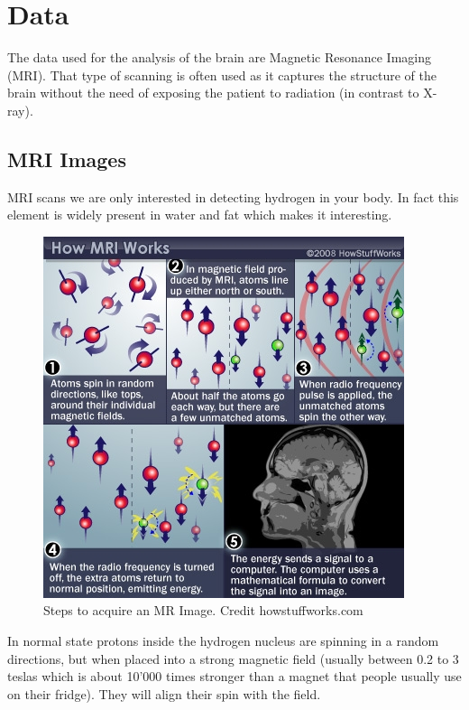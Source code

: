 \chapter{Data}
The data used for the analysis of the brain are Magnetic Resonance Imaging (MRI). That type of scanning is often used as it captures the structure of the brain without the need of exposing the patient to radiation (in contrast to X-ray).  

\section{MRI Images}

MRI scans we are only interested in detecting hydrogen in your body. In fact this element is widely present in water and fat which makes it interesting.
\begin{figure}
 \centering
 \includegraphics[width=.9\linewidth]{figures/dataset/mri-steps.jpg}
 \captionsetup{width=.9\linewidth}
 \caption[bla]{Steps to acquire an MR Image. Credit howstuffworks.com\footnotemark}
 \label{fig:IXI_hospital_count}
\end{figure}
In normal state protons inside the hydrogen nucleus are spinning in a random directions, but when placed into a strong magnetic field (usually between 0.2 to 3 teslas which is about 10’000 times stronger than a magnet that people usually use on their fridge). They will align their spin with the field.

